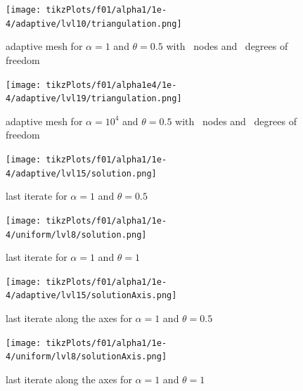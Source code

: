 \documentclass[draft=false,twoside,12pt]{scrreprt}
\begin{document}

\vspace{-\parskip}
\begin{minipage}[t]{0.45\textwidth}
  \begin{figure}[H]
    \texttt{[image: tikzPlots/f01/alpha1/1e-4/adaptive/lvl10/triangulation.png]}
    \caption{adaptive mesh for $\alpha=1$ and $\theta = 0.5$ with \nrNodes\
    nodes and \nrDof\ degrees of freedom}
  \end{figure}
\end{minipage}
\hfill
\vline
\hfill
\begin{minipage}[t]{0.45\textwidth}
  \begin{figure}[H]
  	\centering
    \texttt{[image: tikzPlots/f01/alpha1e4/1e-4/adaptive/lvl19/triangulation.png]}
    \caption{adaptive mesh for $\alpha=10^4$ and $\theta = 0.5$ with
    \nrNodesAlt\ nodes and \nrDofAlt\ degrees of freedom}
  \end{figure}
\end{minipage}


\begin{minipage}[t]{0.45\textwidth}
  \begin{figure}[H]
	  \centering
		\texttt{[image: tikzPlots/f01/alpha1/1e-4/adaptive/lvl15/solution.png]} 
    \caption{last iterate for $\alpha=1$ and $\theta = 0.5$}
  \end{figure}
\end{minipage}
\hfill
\vline
\hfill
\begin{minipage}[t]{0.45\textwidth}
  \begin{figure}[H]
	  \centering
		\texttt{[image: tikzPlots/f01/alpha1/1e-4/uniform/lvl8/solution.png]} 
    \caption{last iterate for $\alpha=1$ and $\theta = 1$}
  \end{figure}
\end{minipage}

\vspace{-\parskip}
\begin{minipage}[t]{0.45\textwidth}
  \begin{figure}[H]
	  \centering
		\texttt{[image: tikzPlots/f01/alpha1/1e-4/adaptive/lvl15/solutionAxis.png]} 
    \caption{last iterate along the axes for $\alpha=1$ and $\theta = 0.5$}
  \end{figure}
\end{minipage}
\hfill
\vline
\hfill
\begin{minipage}[t]{0.45\textwidth}
  \begin{figure}[H]
	  \centering
		\texttt{[image: tikzPlots/f01/alpha1/1e-4/uniform/lvl8/solutionAxis.png]} 
    \caption{last iterate along the axes for $\alpha=1$ and $\theta = 1$}
  \end{figure}
\end{minipage}
\end{document}
